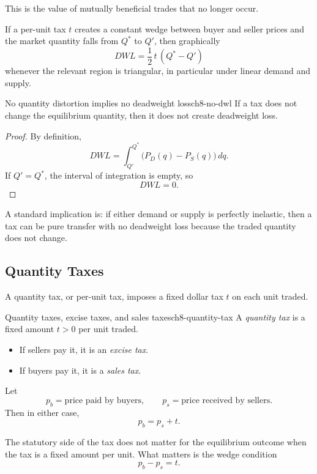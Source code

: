 This is the value of mutually beneficial trades that no longer occur.

\begin{keyformula}[title={Key Formula: Deadweight Loss under a Per-Unit Tax}]
If a per-unit tax $t$ creates a constant wedge between buyer and seller prices and the market quantity falls from $Q^*$ to $Q'$, then graphically
\[
DWL=\frac12\, t \,(Q^*-Q')
\]
whenever the relevant region is triangular, in particular under linear demand and supply.
\end{keyformula}

\begin{theorem}{No quantity distortion implies no deadweight loss}{ch8-no-dwl}
If a tax does not change the equilibrium quantity, then it does not create deadweight loss.
\end{theorem}

\begin{proof}
By definition,
\[
DWL=\int_{Q'}^{Q^*} \bigl(P_D(q)-P_S(q)\bigr)\,dq.
\]
If $Q'=Q^*$, the interval of integration is empty, so
\[
DWL=0.
\]
\end{proof}

\begin{examtip}
A standard implication is: if either demand or supply is perfectly inelastic, then a tax can be pure transfer with no deadweight loss because the traded quantity does not change.
\end{examtip}

\subsection{Quantity Taxes}

A quantity tax, or per-unit tax, imposes a fixed dollar tax $t$ on each unit traded.

\begin{definition}{Quantity taxes, excise taxes, and sales taxes}{ch8-quantity-tax}
A \emph{quantity tax} is a fixed amount $t>0$ per unit traded.
\begin{itemize}
    \item If sellers pay it, it is an \emph{excise tax}.
    \item If buyers pay it, it is a \emph{sales tax}.
\end{itemize}
Let
\[
p_b = \text{price paid by buyers},
\qquad
p_s = \text{price received by sellers}.
\]
Then in either case,
\[
p_b=p_s+t.
\]
\end{definition}

The statutory side of the tax does not matter for the equilibrium outcome when the tax is a fixed amount per unit. What matters is the wedge condition
\[
p_b-p_s=t.
\]

